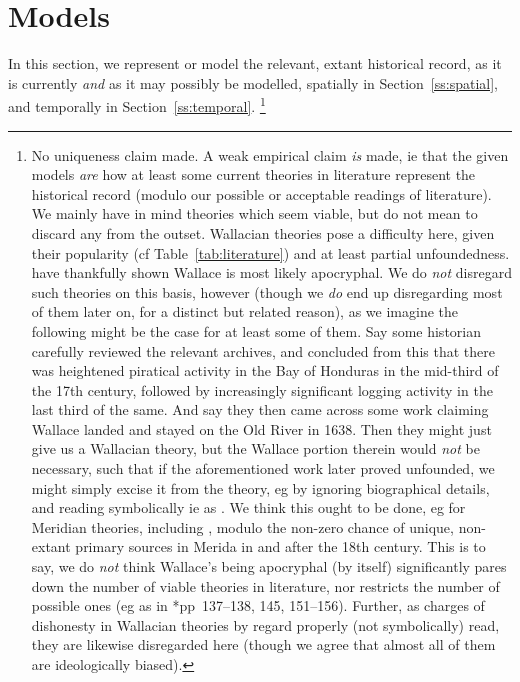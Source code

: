 \section{Models}
\label{s:models}
	In this section, we represent or model the relevant, extant historical record, as it is currently \emph{and} as it may possibly be modelled, spatially in Section~\ref{ss:spatial}, and temporally in Section~\ref{ss:temporal}.%
	\footnote{No uniqueness claim made. A weak empirical claim \emph{is} made, ie that the given models \emph{are} how at least some current theories in literature represent the historical record (modulo our possible or acceptable readings of literature). We mainly have in mind theories which seem viable, but do not mean to discard any from the outset. Wallacian theories pose a difficulty here, given their popularity (cf Table~\ref{tab:literature}) and at least partial unfoundedness.  have thankfully shown Wallace is most likely apocryphal. We do \emph{not} disregard such theories on this basis, however (though we \emph{do} end up disregarding most of them later on, for a distinct but related reason), as we imagine the following might be the case for at least some of them. Say some historian carefully reviewed the relevant archives, and concluded from this that there was heightened piratical activity in the Bay of Honduras in the mid-third of the 17th century, followed by increasingly significant logging activity in the last third of the same. And say they then came across some work claiming Wallace landed and stayed on the Old River in 1638. Then they might just give us a Wallacian theory, but the Wallace portion therein would \emph{not} be necessary, such that if the aforementioned work later proved unfounded, we might simply excise it from the theory, eg by ignoring biographical details, and reading  symbolically ie as . We think this ought to be done, eg for Meridian theories, including , modulo the non-zero chance of unique, non-extant primary sources in Merida in and after the 18th century. This is to say, we do \emph{not} think Wallace's being apocryphal (by itself) significantly pares down the number of viable theories in literature, nor restricts the number of possible ones (eg as in \cite{bul16}*{pp~137--138, 145, 151--156}). Further, as charges of dishonesty in Wallacian theories by  regard  properly (not symbolically) read, they are likewise disregarded here (though we agree that almost all of them are ideologically biased).}
	
